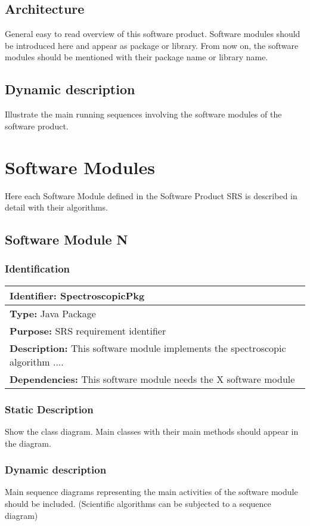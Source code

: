 \documentclass[CUx,lsstdraft,SDD]{lsstdoc}
\begin{document}
\subsection{Architecture \label{sect:arc}}
General easy to read overview of this software product. Software modules should be introduced here and appear as package or library. From now on, the software modules should be mentioned with their package name or library name.

\subsection{Dynamic description \label{sect:dyn}}
Illustrate the main running sequences involving the software modules of the software product.  

\section{Software Modules}
Here each Software Module defined in the Software Product SRS is
described in detail with their algorithms.

\subsection{Software Module N}

\subsubsection{Identification}
\begin{longtable}{|p{}|}\hline
{\bf Identifier:} SpectroscopicPkg \\\hline
{\bf Type:} Java Package \\\hline
{\bf Purpose:} SRS requirement identifier\\\hline
{\bf Description:} This software module implements the spectroscopic algorithm ....\\\hline
{\bf Dependencies:} This software module needs the X software module\\\hline
\end{longtable} \normalsize
\subsubsection{Static Description}
Show the class diagram. Main classes with their main methods should appear in the diagram.
\subsubsection{Dynamic description}
Main sequence diagrams representing the main activities of the software module should be included. (Scientific algorithms can be subjected to a sequence diagram)
\end{document}
